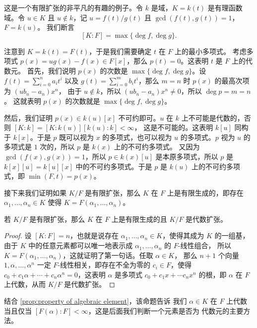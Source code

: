 \begin{example}\label{exa:degree of rational function}
  这是一个有限扩张的非平凡的有趣的例子。令 $k$ 是域，$K=k(t)$ 是有理函数域。令
  $u\in K$ 且 $u\notin k$，记 $u=f(t)/g(t)$ 且 $\gcd(f(t),g(t))=1$，$F=k(u)$。
  我们断言
  \[
    [K:F]=\max\{\deg f,\deg g\}.
  \]
  
  注意到 $K=k(t)=F(t)$，于是我们需要确定 $t$ 在 $F$ 上的最小多项式。
  考虑多项式 $p(x)=ug(x)-f(x)\in F[x]$，那么 $p(t)=0$。这表明 $t$ 是 $F$ 上的代数元。
  首先，我们说明 $p(x)$ 的次数是 $\max\{\deg f,\deg g\}$。设 $f(t)=\sum_{i=0}^n a_it^i$
  以及 $g(t)=\sum_{i=0}^m b_it^i$，那么 $m=n$ 时 $p(x)$ 的最高次项为 $(ub_n-a_n)x^n$，
  由于 $u\notin k$，所以 $(ub_n-a_n)x^n\neq 0$，所以 $\deg p=m=n$。
  这就表明 $p(x)$ 的次数就是 $\max\{\deg f,\deg g\}$。

  然后，我们证明 $p(x)\in k(u)[x]$ 不可约即可。$u$ 在 $k$ 上不可能是代数的，否则 $[K:k]=[K:k(u)][k(u):k]<\infty$，
  这是不可能的。这表明 $k[u]$ 同构于 $k[x]$。于是 $p$ 既可以视为 $x$ 的多项式，也可以视为 $u$
  的多项式。$p$ 视为 $u$ 的多项式是 $1$ 次的，所以 $p$ 是 $k(x)$ 上的不可约多项式。
  又因为 $\gcd(f(x),g(x))=1$，所以 $p\in k(x)[u]$ 是本原多项式，所以 $p$ 是 $k[x][u]=k[u][x]$
  中的不可约多项式。于是 $p$ 是 $k(u)$ 上的不可约多项式，即 $\min (F,t)=p(x)$。
\end{example}



接下来我们证明如果 $K/F$ 是有限扩张，那么 $K$ 在 $F$ 上是有限生成的，即存在 $\alpha_1,\dots,\alpha_n\in K$
使得 $K=F(\alpha_1,\dots,\alpha_n)$。

\begin{proposition}
  若 $K/F$ 是有限扩张，那么 $K$ 在 $F$ 上是有限生成的且 $K/F$ 是代数扩张。
\end{proposition}
\begin{proof}
  设 $[K:F]=n$，也就是说存在 $\alpha_1,\dots,\alpha_n\in K$，使得其成为 $K$ 的一组基，由于
  $K$ 中的任意元素都可以唯一地表示成 $\alpha_1,\dots,\alpha_n$ 的 $F$-线性组合，
  所以 $K=F(\alpha_1,\dots,\alpha_n)$，这就证明了第一句话。任取 $\alpha\in K$，
  那么 $n+1$ 个向量 $1,\alpha,\dots,\alpha^n$ 一定 $F$-线性相关，即存在不全为零的
  $c_i\in F$，使得 $c_0+c_1\alpha+\cdots+c_n\alpha^n=0$，这表明 $\alpha$
  是多项式 $c_0+c_1x+\cdots c_nx^n$ 的根，即 $\alpha$ 在 $F$ 上代数，从而 $K/F$
  是代数扩张。
\end{proof}

结合 \autoref{prop:property of algebraic element}，该命题告诉
我们 $\alpha\in K$ 在 $F$ 上代数当且仅当 $[F(\alpha):F]<\infty$，这是后面我们判断一个元素是否为
代数元的主要方法。


